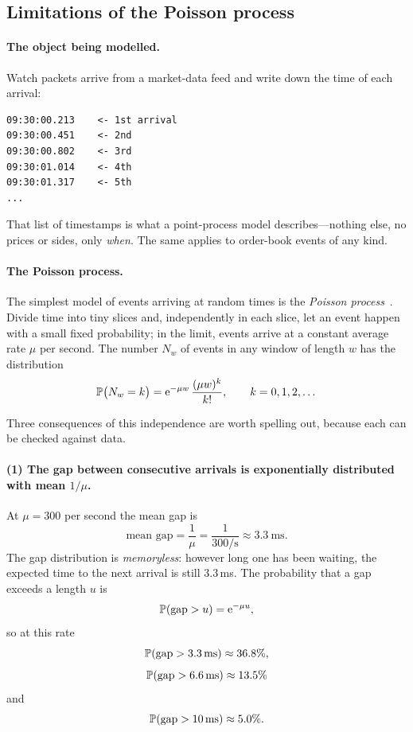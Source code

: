 \subsection{Limitations of the Poisson process}
\label{sec:pp-poisson}

\paragraph{The object being modelled.} Watch packets arrive from a market-data feed and write down the
time of each arrival:
\begin{verbatim}
09:30:00.213    <- 1st arrival
09:30:00.451    <- 2nd
09:30:00.802    <- 3rd
09:30:01.014    <- 4th
09:30:01.317    <- 5th
...
\end{verbatim}
That list of timestamps is what a point-process model describes---nothing else, no prices or sides,
only \emph{when}. The same applies to order-book events of any kind.

\paragraph{The Poisson process.} The simplest model of events arriving at random times is the \emph{Poisson
process}~\citep{daley2003}. Divide time into tiny slices and, independently in each slice, let an
event happen with a small fixed probability; in the limit, events arrive at a constant average rate
$\mu$ per second. The number $N_w$ of events in any window of length $w$ has the distribution
\begin{equation}
  \P\big(N_w = k\big) = \mathrm{e}^{-\mu w}\, \frac{(\mu w)^k}{k!}, \qquad k = 0, 1, 2, \dots
\end{equation}

Three consequences of this independence are worth
spelling out, because each can be checked against data.

\paragraph{(1) The gap between consecutive arrivals is exponentially distributed with mean
$1/\mu$.} At $\mu = 300$ per second the mean gap is
\[
  \text{mean gap} = \frac{1}{\mu} = \frac{1}{300/\mathrm{s}} \approx 3.3\ \mathrm{ms}.
\]
The gap distribution is \emph{memoryless}: however long one has been waiting, the expected time to
the next arrival is still $3.3$\,ms. The probability that a gap exceeds a length $u$ is
\[
  \P(\text{gap} > u) = \mathrm{e}^{-\mu u},
\]
so at this rate 
\[
  \P(\text{gap} > 3.3\,\mathrm{ms}) \approx 36.8\%,
\]
\[
  \P(\text{gap} > 6.6\,\mathrm{ms}) \approx 13.5\%
\]
and 
\[
  \P(\text{gap} > 10\,\mathrm{ms}) \approx 5.0\%.
\]

